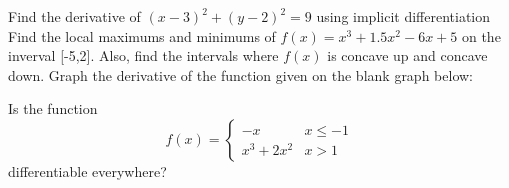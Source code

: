\documentclass[11pt]{exam}
\begin{document}
\begin{questions}
		\newpage\addpoints
		\question[10] Find the derivative of $(x-3)^2+(y-2)^2=9$ using implicit differentiation
		\newpage\addpoints
		\question[20] Find the local maximums and minimums of $f(x)=x^3+1.5x^2-6x+5$ on the inverval [-5,2]. Also, find the intervals where $f(x)$ is concave up and concave down.
		\newpage\addpoints
		\question[10] Graph the derivative of the function given on the blank graph below:
		\begin{center}
	\end{center}
		\vspace{1in}
		\begin{center}
	\end{center}
		\newpage\addpoints
		\question[10] Is the function \[
		f(x)=
		\begin{cases}
		-x & x\leq -1\\
		x^3+2x^2 & x>1 
		\end{cases}
		\]
		differentiable everywhere?
	\end{questions}
\end{document}

